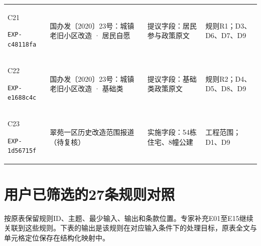 \documentclass[UTF8,11pt,fontset=windows]{ctexart}
\begin{document}
{\begin{longtable}{@{}L{29mm}L{36mm}L{56mm}L{32mm}@{}}
\hypertarget{EXP-c48118fa-9af5-4f9a-a634-ae276701cc6a}{C21}\newline\texttt{EXP-c48118fa} & 国办发〔2020〕23号：城镇老旧小区改造 · 居民自愿 & 提议字段：居民参与政策原文 & 规则R1；D3、D6、D7、D9\\
\hypertarget{EXP-e1688c4c-a449-48d4-9d16-38fea3ca845e}{C22}\newline\texttt{EXP-e1688c4c} & 国办发〔2020〕23号：城镇老旧小区改造 · 基础类 & 提议字段：基础类政策原文 & 规则R2；D4、D5、D8、D9\\
\hypertarget{EXP-1d56715f-f6b6-4e9f-8298-5ce656ee40c5}{C23}\newline\texttt{EXP-1d56715f} & 翠苑一区历史改造范围报道（待复核） & 实施字段：54栋住宅、8幢公建 & 工程范围；D1、D9\\
\bottomrule
\end{longtable}
}


\section{用户已筛选的27条规则对照}

按原表保留规则ID、主题、最少输入、输出和条款位置。专家补充E01至E15继续关联到这些规则。下表的输出是该规则在对应输入条件下的处理目标，原表全文与单元格定位保存在结构化映射中。
\end{document}
